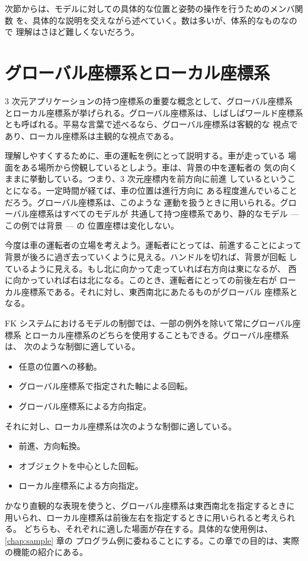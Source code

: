 次節からは、モデルに対しての具体的な位置と姿勢の操作を行うためのメンバ関数
を、具体的な説明を交えながら述べていく。数は多いが、体系的なものなので
理解はさほど難しくないだろう。
\section{グローバル座標系とローカル座標系}
3 次元アプリケーションの持つ座標系の重要な概念として、グローバル座標系
とローカル座標系が挙げられる。グローバル座標系は、しばしばワールド座標系
とも呼ばれる。平易な言葉で述べるなら、グローバル座標系は客観的な
視点であり、ローカル座標系は主観的な視点である。

理解しやすくするために、車の運転を例にとって説明する。車が走っている
場面をある場所から傍観しているとしよう。車は、背景の中を運転者の
気の向くままに挙動している。つまり、3 次元座標内を前方向に前進
しているということになる。一定時間が経てば、車の位置は進行方向に
ある程度進んでいることだろう。グローバル座標系は、このような
運動を扱うときに用いられる。グローバル座標系はすべてのモデルが
共通して持つ座標系であり、静的なモデル --- この例では背景 --- の
位置座標は変化しない。

今度は車の運転者の立場を考えよう。運転者にとっては、前進することによって
背景が後ろに過ぎ去っていくように見える。ハンドルを切れば、背景が回転
しているように見える。もし北に向かって走っていれば右方向は東になるが、
西に向かっていれば右は北になる。このとき、運転者にとっての前後左右が
ローカル座標系である。それに対し、東西南北にあたるものがグローバル
座標系となる。

FK システムにおけるモデルの制御では、一部の例外を除いて常にグローバル座標系
とローカル座標系のどちらを使用することもできる。グローバル座標系は、
次のような制御に適している。
\begin{itemize}
 \item 任意の位置への移動。
 \item グローバル座標系で指定された軸による回転。
 \item グローバル座標系による方向指定。
\end{itemize}
それに対し、ローカル座標系は次のような制御に適している。
\begin{itemize}
 \item 前進、方向転換。
 \item オブジェクトを中心とした回転。
 \item ローカル座標系による方向指定。
\end{itemize}
かなり直観的な表現を使うと、グローバル座標系は東西南北を指定するときに
用いられ、ローカル座標系は前後左右を指定するときに用いられると考えられる。
どちらも、それぞれに適した場面が存在する。具体的な使用例は、
\ref{chap:sample} 章の
プログラム例に委ねることにする。この章での目的は、実際の機能の紹介にある。

